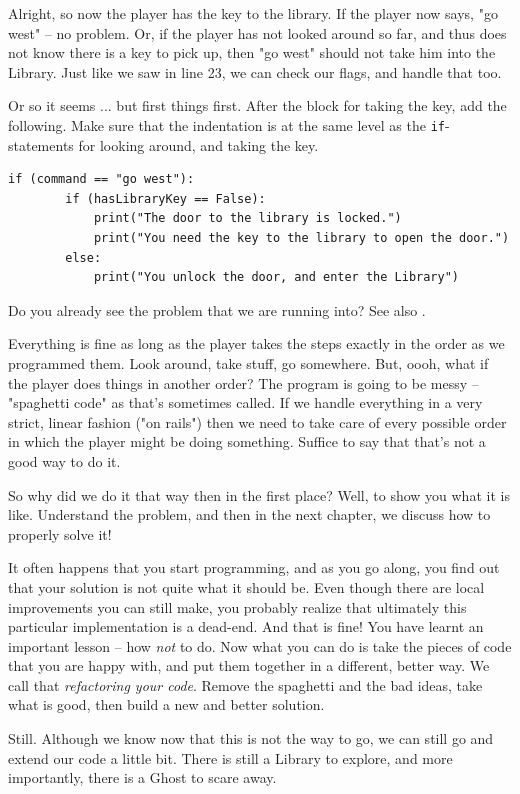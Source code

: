 Alright, so now the player has the key to the library. If the player now says, "go west" -- no problem. Or, if the player has not looked around so far, and thus does not know there is a key to pick up, then "go west" should not take him into the Library. Just like we saw in line 23, we can check our flags, and handle that too. 

Or so it seems ... but first things first. After the block for taking the key, add the following. Make sure that the indentation is at the same level as the \texttt{if}-statements for looking around, and taking the key. 

\begin{lstlisting}[firstnumber=last]
if (command == "go west"):
        if (hasLibraryKey == False):
            print("The door to the library is locked.")
            print("You need the key to the library to open the door.")
        else:
            print("You unlock the door, and enter the Library")
\end{lstlisting}

\begin{Exe}
Do you already see the problem that we are running into? See also . \expend
\end{Exe}

Everything is fine as long as the player takes the steps exactly in the order as we programmed them. Look around, take stuff, go somewhere. But, oooh, what if the player does things in another order? The program is going to be messy -- "spaghetti code" as that's sometimes called. If we handle everything in a very strict, linear fashion ("on rails") then we need to take care of every possible order in which the player might be doing something. Suffice to say that that's not a good way to do it. 

So why did we do it that way then in the first place? Well, to show you what it is like. Understand the problem, and then in the next chapter, we discuss how to properly solve it!

\begin{Exp}[Refactoring] 
It often happens that you start programming, and as you go along, you find out that your solution is not quite what it should be. Even though there are local improvements you can still make, you probably realize that ultimately this particular implementation is a dead-end. And that is fine! You have learnt an important lesson -- how \emph{not} to do. Now what you can do is take the pieces of code that you are happy with, and put them together in a different, better way. We call that \emph{refactoring your code}. Remove the spaghetti and the bad ideas, take what is good, then build a new and better solution. \expend    
\end{Exp} 

Still. Although we know now that this is not the way to go, we can still go and extend our code a little bit. There is still a Library to explore, and more importantly, there is a Ghost to scare away. 












  